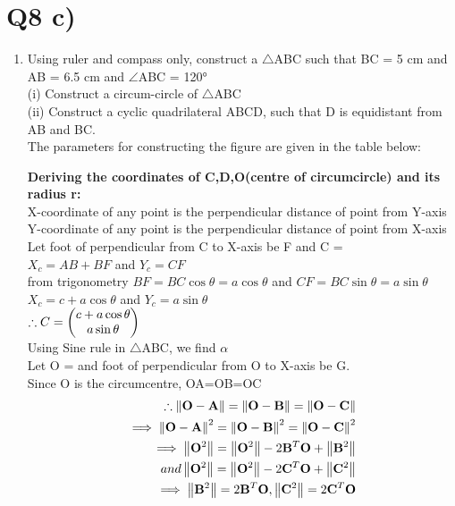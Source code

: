 \documentclass[journal,12pt,twocolumn]{IEEEtran}
\renewcommand\thesection{\arabic{section}}
\begin{document}
\section{Q8 c)}
\begin{enumerate}[label=\thesection.\arabic*.,ref=\thesection.\theenumi]
\item Using ruler and compass only, construct a $\bigtriangleup$ABC such that BC = 5 cm
and AB = 6.5 cm and $\angle$ABC = 120°\\
(i) Construct a circum-circle of $\bigtriangleup$ABC\\
(ii) Construct a cyclic quadrilateral ABCD, such that D is equidistant from AB and BC.\\

\solution The parameters for constructing the figure are given in the table below:

\begin{table}[h]
\centering
\caption{}
 	
\end{table}

\textbf{Deriving the coordinates of C,D,O(centre of circumcircle) and its radius r:}\\

X-coordinate of any point is the perpendicular distance of point from Y-axis\\
Y-coordinate of any point is the perpendicular distance of point from X-axis\\

Let foot of perpendicular from C to X-axis be F and C = \\
$X_c=AB+BF$ and $Y_c = CF$\\
from trigonometry $BF = BC\cos \theta = a\cos \theta$ and $CF = BC\sin \theta = a\sin \theta$ \\
$X_c = c + a\cos \theta$ and $Y_c = a\sin \theta$ \\ 
$\therefore C = \begin{pmatrix}c + a\cos \theta \\ a\sin \theta\end{pmatrix} $\\
Using Sine rule in $\bigtriangleup$ABC, we find $\alpha$\\
Let O =  and foot of perpendicular from O to X-axis be G.\\
Since O is the circumcentre, OA=OB=OC\\
\begin{align}
\therefore \left\lVert\mathbf{O} - \mathbf{A}\right\rVert = \left\lVert\mathbf{O} - \mathbf{B}\right\rVert = \left\lVert\mathbf{O} - \mathbf{C}\right\rVert\\
\implies \left\lVert\mathbf{O} - \mathbf{A}\right\rVert^{2} = \left\lVert\mathbf{O} - \mathbf{B}\right\rVert^{2} = \left\lVert\mathbf{O} - \mathbf{C}\right\rVert^{2}\\
\implies \left\lVert\mathbf{O}^{2}\right\rVert = \left\lVert\mathbf{O}^{2}\right\rVert - 2\mathbf{B}^{T}\mathbf{O} + \left\lVert\mathbf{B}^{2}\right\rVert\\ 
and \left\lVert\mathbf{O}^{2}\right\rVert = \left\lVert\mathbf{O}^{2}\right\rVert - 2\mathbf{C}^{T}\mathbf{O} + \left\lVert\mathbf{C}^{2}\right\rVert\\
\implies \left\lVert\mathbf{B}^{2}\right\rVert = 2\mathbf{B}^{T}\mathbf{O}, \left\lVert\mathbf{C}^{2}\right\rVert = 2\mathbf{C}^{T}\mathbf{O}
\end{align}


\end{enumerate}
\end{document}

